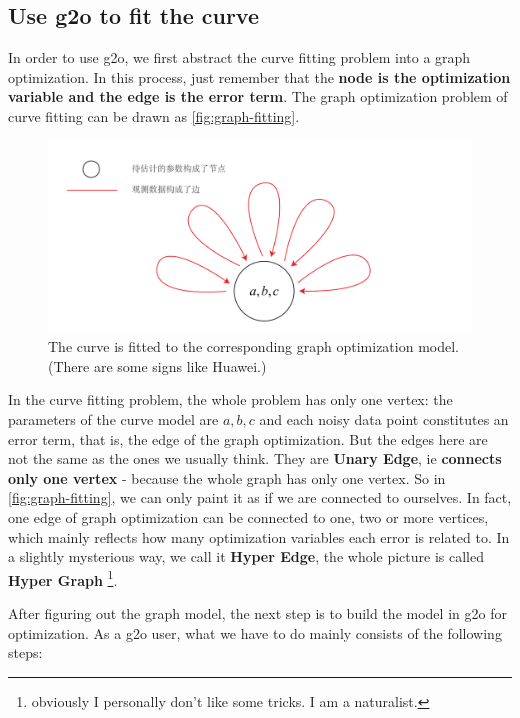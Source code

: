 \subsection{Use g2o to fit the curve}

In order to use g2o, we first abstract the curve fitting problem into a graph optimization. In this process, just remember that the \textbf{node is the optimization variable and the edge is the error term}. The graph optimization problem of curve fitting can be drawn as \autoref{fig:graph-fitting}.

\begin{figure}[!ht]
	\centering
	\includegraphics[width=.9 \textwidth]{chapter06/optimization/graphFitting.pdf}
	\caption{The curve is fitted to the corresponding graph optimization model. (There are some signs like Huawei.)}
	\label{fig:graph-fitting}
\end{figure}

In the curve fitting problem, the whole problem has only one vertex: the parameters of the curve model are $a, b, c$ and each noisy data point constitutes an error term, that is, the edge of the graph optimization.
But the edges here are not the same as the ones we usually think.
They are \textbf{Unary Edge}, ie \textbf{connects only one vertex} - because the whole graph has only one vertex.
So in \autoref{fig:graph-fitting}, we can only paint it as if we are connected to ourselves.
In fact, one edge of graph optimization can be connected to one, two or more vertices, which mainly reflects how many optimization variables each error is related to.
In a slightly mysterious way, we call it \textbf{Hyper Edge}, the whole picture is called \textbf{Hyper Graph} \footnote{ obviously I personally don't like some tricks. I am a naturalist. }.

After figuring out the graph model, the next step is to build the model in g2o for optimization. As a g2o user, what we have to do mainly consists of the following steps:

